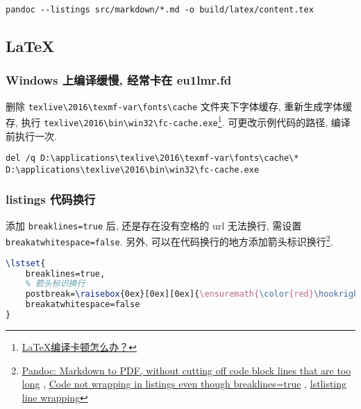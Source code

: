 \begin{lstlisting}
pandoc --listings src/markdown/*.md -o build/latex/content.tex
\end{lstlisting}

\subsection{LaTeX}\label{latex}

\subsubsection{Windows 上编译缓慢, 经常卡在
eu1lmr.fd}\label{windows-ux4e0aux7f16ux8bd1ux7f13ux6162-ux7ecfux5e38ux5361ux5728-eu1lmr.fd}

删除 \lstinline!texlive\2016\texmf-var\fonts\cache! 文件夹下字体缓存,
重新生成字体缓存, 执行
\lstinline!texlive\2016\bin\win32\fc-cache.exe!\footnote{\href{https://www.zhihu.com/question/51999238/answer/135852542}{LaTeX编译卡顿怎么办？}}.
可更改示例代码的路径, 编译前执行一次.

\begin{lstlisting}
del /q D:\applications\texlive\2016\texmf-var\fonts\cache\*
D:\applications\texlive\2016\bin\win32\fc-cache.exe
\end{lstlisting}

\subsubsection{listings
代码换行}\label{listings-ux4ee3ux7801ux6362ux884c}

添加 \lstinline!breaklines=true! 后, 还是存在没有空格的 url 无法换行,
需设置 \lstinline!breakatwhitespace=false!. 另外,
可以在代码换行的地方添加箭头标识换行\footnote{\href{http://tex.stackexchange.com/questions/179926/pandoc-markdown-to-pdf-without-cutting-off-code-block-lines-that-are-too-long}{Pandoc:
  Markdown to PDF, without cutting off code block lines that are too
  long} ,
  \href{http://tex.stackexchange.com/questions/174569/code-not-wrapping-in-listings-even-though-breaklines-true}{Code
  not wrapping in listings even though breaklines=true} ,
  \href{http://tex.stackexchange.com/questions/116534/lstlisting-line-wrapping}{lstlisting
  line wrapping}}.

\begin{lstlisting}[language=TeX]
\lstset{
    breaklines=true,
    % 箭头标识换行
    postbreak=\raisebox{0ex}[0ex][0ex]{\ensuremath{\color{red}\hookrightarrow\space}},
    breakatwhitespace=false
}
\end{lstlisting}

